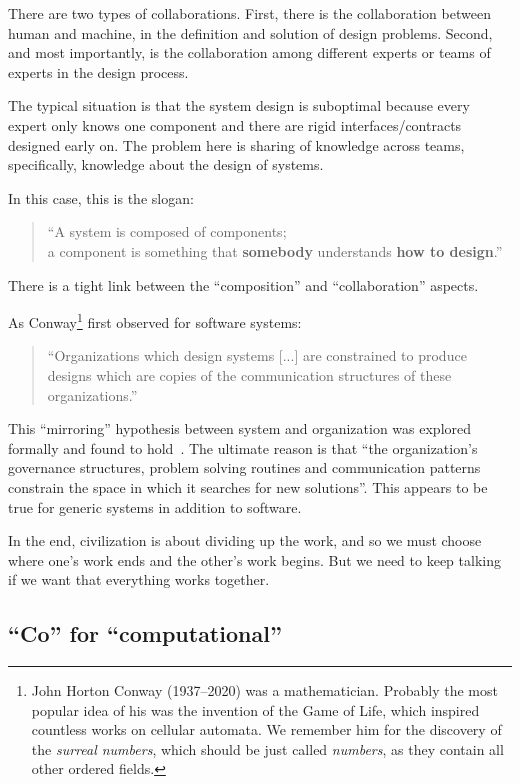 There are two types of collaborations.
First, there is the collaboration between human and machine, in the definition and solution of design problems.
Second, and most importantly, is the collaboration among different experts or teams of experts in the design process.

The typical situation is that the system design is suboptimal because every expert only knows one component and there are rigid interfaces/contracts designed early on.
The problem here is sharing of knowledge across teams, specifically, knowledge about the design of systems.

In this case, this is the slogan:

\begin{quote}
    \enquote{A system is composed of components;\\
    a component is something that \textbf{somebody} understands
    \textbf{how to design}.}
\end{quote}


There is a tight link between the ``composition'' and ``collaboration'' aspects.

As Conway\footnote{John Horton Conway (1937--2020) was a mathematician. Probably the most popular idea of his was the invention of the Game of Life, which inspired countless works on cellular automata. We remember him for the discovery of the \emph{surreal numbers}, which should be just called \emph{numbers}, as they contain all other ordered fields.} first observed for software systems:

\begin{quote}
    \enquote{Organizations which design systems [...] are constrained to produce designs which are copies of the communication structures of these organizations.}
\end{quote}


This ``mirroring'' hypothesis between system and organization was explored formally and found to hold~\cite{maccormack12exploring}. The ultimate reason is that ``the organization's governance structures, problem solving routines and communication patterns constrain the space in which it searches for new solutions''. This appears to be true for generic systems in addition to software.

In the end, civilization is about dividing up the work, and so we must choose where one's work ends and the other's work begins. But we need to keep talking if we want that everything works together.

\subsection{``Co'' for ``computational''}

